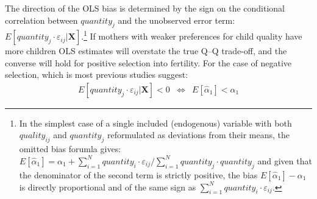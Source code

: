 \documentclass[subeqn]{article}
\begin{document}
\begin{spacing}{1.4}
The direction of the OLS bias is determined by the sign on the conditional correlation
between $quantity_j$ and the unobserved error term:
$E[quantity_{j}\cdot\varepsilon_{ij}|\bm{X}]$.\footnote{In the simplest case
  of a single included (endogenous) variable with both $quality_{ij}$ and
  $quantity_j$ reformulated as deviations from their means, the omitted bias
  forumla gives:
  $
  E[\hat\alpha_1]=\alpha_1+\sum_{i=1}^N quantity_i\cdot\varepsilon_{ij}/\sum_{i=1}^N quantity_j\cdot quantity_j
  $
  and given that the denominator of the second term is strictly positive, the
  bias $E[\hat\alpha_1]-\alpha_1$ is directly proportional and of the same
  sign as $\sum_{i=1}^N quantity_i\cdot\varepsilon_{ij}$.
}
If mothers with weaker preferences for child quality have more children 
OLS estimates will overstate the true Q--Q trade-off, and the converse will hold for positive selection into fertility.
For the case of negative selection, which is most previous studies suggest:
\begin{eqnarray}
  E[quantity_{j}\cdot\varepsilon_{ij}|\bm{X}] < 0 &\Leftrightarrow& E[\hat\alpha_1] < \alpha_1 \nonumber 
\end{eqnarray}


\end{spacing}
\end{document}
